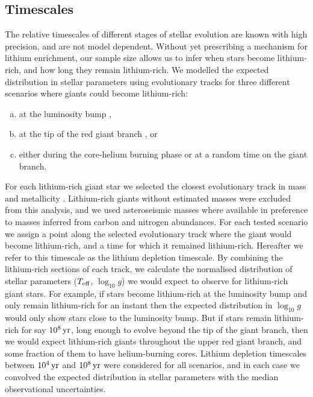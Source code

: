 \documentclass[twocolumn]{aastex62}
\begin{document}
\vspace{2em}
\subsection{Timescales}

The relative timescales of different stages of stellar evolution are known with
high precision, and are not model dependent. 
Without yet prescribing a mechanism for lithium 
enrichment, our sample size allows us to infer when stars become lithium-rich,
and how long they remain lithium-rich. We modelled the expected distribution 
in stellar parameters using evolutionary tracks \citep{Dotter_2016,Choi_2016}
for three different scenarios where giants could become lithium-rich:
\begin{enumerate}[(a)]
	\item at the luminosity bump \citep[e.g.,][]{Charbonnel_2000},
	\item at the tip of the red giant branch \citep[e.g.,][]{Lattanzio_2014}, or
	\item either during the core-helium burning phase or at a random time on the giant branch.
\end{enumerate} 


For each lithium-rich giant star we selected the closest evolutionary track in 
mass and metallicity \citep{Dotter_2016,Choi_2016}. Lithium-rich giants without 
estimated masses were excluded from this analysis, and we used asteroseismic masses 
where available in preference to masses inferred from carbon and nitrogen abundances. 
For each tested scenario we assign a point along the selected evolutionary track 
where the giant would become lithium-rich, and a time for which it remained 
lithium-rich. Hereafter we refer to this timescale as the lithium depletion timescale. 
By combining the lithium-rich sections of each track, we calculate the normalised distribution 
of stellar parameters ($T_{\rm eff}$, $\log_{10}{g}$) we would expect to 
observe for lithium-rich giant stars. For example, if stars become lithium-rich 
at the luminosity bump and only remain lithium-rich for an instant then the expected
distribution in $\log_{10}{g}$ would only show stars close to the luminosity bump.
But if stars remain lithium-rich for say $10^8\,{\rm yr}$, long enough to evolve 
beyond the tip of the giant branch, then we would expect lithium-rich giants 
throughout the upper red giant branch, and some fraction of them to have
helium-burning cores.
Lithium depletion timescales between $10^4\,{\rm yr}$ and $10^8\,{\rm yr}$ were 
considered for all scenarios, and in each case we convolved the expected distribution in stellar 
parameters with the median observational uncertainties. 
\end{document}
